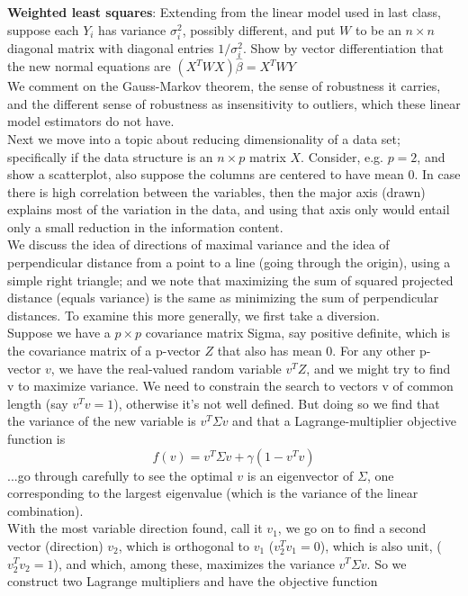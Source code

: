 \documentclass[11pt,a4paper]{article}
\begin{document}
\textbf{Weighted least squares}:  Extending from the linear model used in last class, suppose each $Y_i$ has variance $\sigma_i^2$, possibly different, and put $W$ to be an $n\times n$ diagonal matrix with diagonal entries $1/\sigma_i^2$.  Show by vector differentiation that the new normal equations are $(X^T W X) \hat{\beta} = X^T W Y$\\
We comment on the Gauss-Markov theorem, the sense of robustness it carries, and the different sense of robustness as insensitivity to outliers, which these linear model estimators do not have.\\
Next we move into a topic about reducing dimensionality of a data set; specifically if the data structure is an $n \times p$ matrix $X$.  Consider, e.g. $p=2$, and show a scatterplot, also suppose the columns are centered to have mean 0.  In case there is high correlation between the variables, then the major axis (drawn) explains most of the variation in the data, and using that axis only would entail only a small reduction in the information content.\\
We discuss the idea of directions of maximal variance and the idea of perpendicular distance from a point to a line (going through the origin), using a simple right triangle; and we note that maximizing the sum of squared projected distance (equals variance) is the same as minimizing the sum of perpendicular distances.  To examine this more generally, we first take a diversion.\\
Suppose we have  a $p\times p$ covariance matrix Sigma, say positive definite, which is the covariance matrix of a p-vector $Z$ that also has mean 0.  For any other p-vector $v$, we have the real-valued random variable $v^T Z$, and we might try to find v to maximize variance.  We need to constrain the search to vectors v of common length (say $v^T v = 1$), otherwise it's not well defined.  But doing so we find that the variance of the new variable is $v^T \Sigma v$ and that a Lagrange-multiplier objective function is 
$$f(v) = v^T \Sigma v + \gamma( 1 - v^T v )$$ ...go through carefully to see the optimal $v$ is an eigenvector of $\Sigma$, one corresponding to the largest eigenvalue (which is the variance of the linear combination).\\
With the most variable direction found, call it $v_1$, we go on to find a second vector (direction) $v_2$, which is orthogonal to $v_1$ ($v_2^T v_1=0$), which is also unit, ($v_2^T v_2=1$), and which, among these, maximizes the variance $v^T \Sigma v$.  So we construct two Lagrange multipliers and have the objective function
\end{document}
